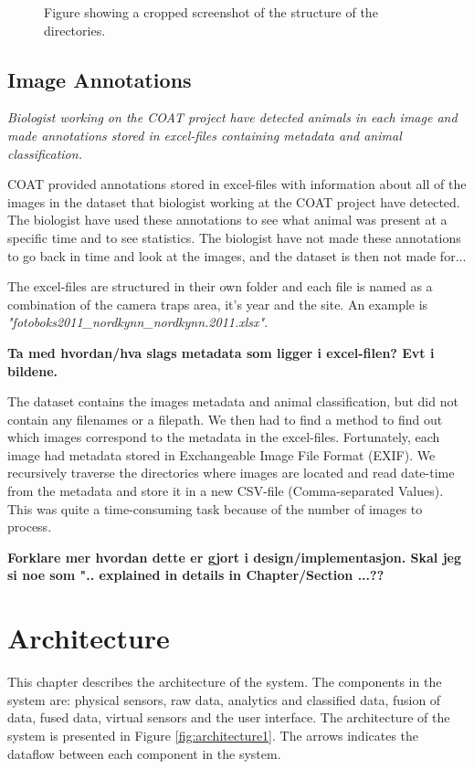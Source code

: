 \documentclass[USenglish]{uit-thesis}
\begin{document}
\begin{figure}
\caption{Figure showing a cropped screenshot of the structure of the directories.}
\label{fig:directories}
\end{figure}

\section{Image Annotations}
\textit{Biologist working on the COAT project have detected animals in each image and made annotations stored in excel-files containing metadata and animal classification.}

COAT provided annotations stored in excel-files with information about all of the images in the dataset that biologist working at the COAT project have detected. The biologist have used these annotations to see what animal was present at a specific time and to see statistics. The biologist have not made these annotations to go back in time and look at the images, and the dataset is then not made for...

 
The excel-files are structured in their own folder and each file is named as a combination of the camera traps area, it's year and the site. An example is \textit{"fotoboks2011\_nordkynn\_nordkynn.2011.xlsx"}.

\textbf{Ta med hvordan/hva slags metadata som ligger i excel-filen? Evt i bildene.}

The dataset contains the images metadata and animal classification, but did not contain any filenames or a filepath. We then had to find a method to find out which images correspond to the metadata in the excel-files. Fortunately, each image had metadata stored in Exchangeable Image File Format (EXIF). We recursively traverse the directories where images are located and read date-time from the metadata and store it in a new CSV-file (Comma-separated Values).
This was quite a time-consuming task because of the number of images to process.

\textbf{Forklare mer hvordan dette er gjort i design/implementasjon. Skal jeg si noe som ".. explained in details in Chapter/Section ...??}



\chapter{Architecture}
This chapter describes the architecture of the system.
The components in the system are: physical sensors, raw data, analytics and classified data, fusion of data, fused data, virtual sensors and the user interface. 
The architecture of the system is presented in Figure \ref{fig:architecture1}. The arrows indicates the dataflow between each component in the system.
\end{document}

